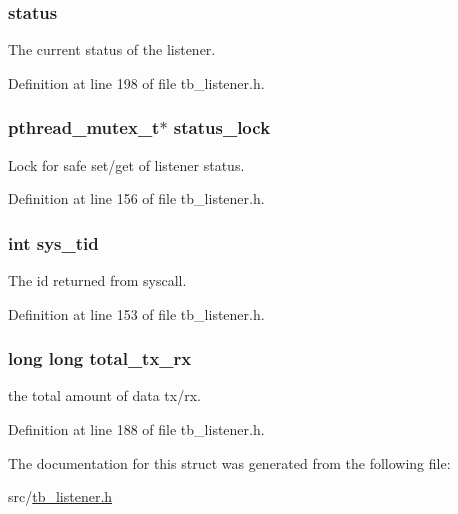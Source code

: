 \hypertarget{structtb__listener__t_a1025e6cbbd3179d2d91b9b4afb8f8efc}{
\subsubsection[{status}]{ status}}\label{structtb__listener__t_a1025e6cbbd3179d2d91b9b4afb8f8efc}


The current status of the listener. 



Definition at line 198 of file tb\-\_\-listener.\-h.

\hypertarget{structtb__listener__t_a54cc7a2ff1d7592de7c4647c6fd66e14}{
\subsubsection[{status\-\_\-lock}]{\setlength{\rightskip}{0pt plus 5cm}pthread\-\_\-mutex\-\_\-t$\ast$ status\-\_\-lock}}\label{structtb__listener__t_a54cc7a2ff1d7592de7c4647c6fd66e14}


Lock for safe set/get of listener status. 



Definition at line 156 of file tb\-\_\-listener.\-h.

\hypertarget{structtb__listener__t_a053be2f9198a10c7329b11c19dfc6fe4}{
\subsubsection[{sys\-\_\-tid}]{\setlength{\rightskip}{0pt plus 5cm}int sys\-\_\-tid}}\label{structtb__listener__t_a053be2f9198a10c7329b11c19dfc6fe4}


The id returned from syscall. 



Definition at line 153 of file tb\-\_\-listener.\-h.

\hypertarget{structtb__listener__t_af6b56edb73bc2df2c5b45cb794532ce5}{
\subsubsection[{total\-\_\-tx\-\_\-rx}]{\setlength{\rightskip}{0pt plus 5cm}long long total\-\_\-tx\-\_\-rx}}\label{structtb__listener__t_af6b56edb73bc2df2c5b45cb794532ce5}


the total amount of data tx/rx. 



Definition at line 188 of file tb\-\_\-listener.\-h.



The documentation for this struct was generated from the following file\-:\begin{DoxyCompactItemize}
\item 
src/\hyperlink{tb__listener_8h}{tb\-\_\-listener.\-h}\end{DoxyCompactItemize}
